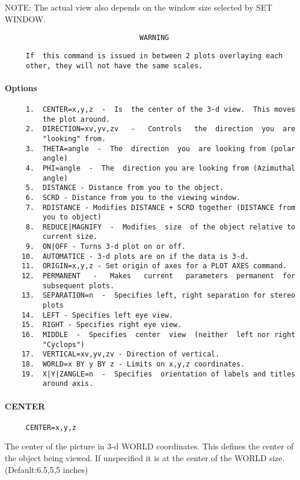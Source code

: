 NOTE:   The actual view also depends on the window size selected by SET
WINDOW.  


\begin{verbatim}
                                WARNING
\end{verbatim}

\begin{verbatim}
     If  this command is issued in between 2 plots overlaying each
     other, they will not have the same scales.  
\end{verbatim}


\paragraph{Options}
\begin{verbatim}
     1.  CENTER=x,y,z  -  Is  the center of the 3-d view.  This moves
         the plot around.  
     2.  DIRECTION=xv,yv,zv   -   Controls   the  direction  you  are
         "looking" from.  
     3.  THETA=angle  -  The  direction  you  are looking from (polar
         angle) 
     4.  PHI=angle  -  The  direction you are looking from (Azimuthal
         angle) 
     5.  DISTANCE - Distance from you to the object.  
     6.  SCRD - Distance from you to the viewing window.  
     7.  RDISTANCE - Modifies DISTANCE + SCRD together (DISTANCE from
         you to object) 
     8.  REDUCE|MAGNIFY  -  Modifies  size  of the object relative to
         current size.  
     9.  ON|OFF - Turns 3-d plot on or off.  
    10.  AUTOMATICE - 3-d plots are on if the data is 3-d.  
    11.  ORIGIN=x,y,z - Set origin of axes for a PLOT AXES command.  
    12.  PERMANENT   -   Makes   current   parameters  permanent  for
         subsequent plots.  
    13.  SEPARATION=n  -  Specifies left, right separation for stereo
         plots 
    14.  LEFT - Specifies left eye view.  
    15.  RIGHT - Specifies right eye view.  
    16.  MIDDLE  -  Specifies  center  view  (neither  left nor right
         "Cyclops") 
    17.  VERTICAL=xv,yv,zv - Direction of vertical.  
    18.  WORLD=x BY y BY z - Limits on x,y,z coordinates.  
    19.  X|Y|ZANGLE=n  -  Specifies  orientation of labels and titles
         around axis.  
\end{verbatim}
\paragraph{CENTER}
\begin{verbatim}
     CENTER=x,y,z 
\end{verbatim}
The center of the picture in 3-d WORLD coordinates.  This defines the
center of the object being viewed.   If  unspecified  it  is  at  the
center of the WORLD size.  (Default:6.5,5,5 inches) 

